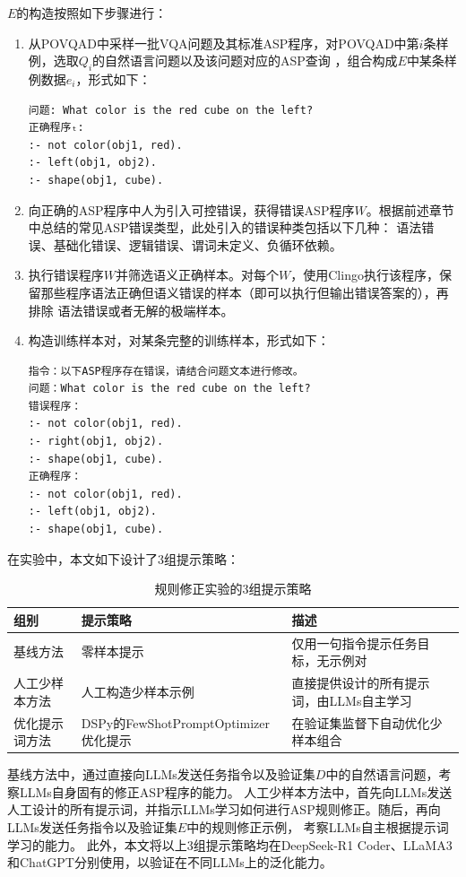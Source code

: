 $E$的构造按照如下步骤进行：
\begin{enumerate}[nosep]
\item 从POVQAD中采样一批VQA问题及其标准ASP程序，对POVQAD中第$i$条样例，选取$Q_i$的自然语言问题以及该问题对应的ASP查询
，组合构成$E$中某条样例数据$e_i$，形式如下：
\begin{lstlisting}
问题: What color is the red cube on the left?
正确程序ₜ:
:- not color(obj1, red).
:- left(obj1, obj2).
:- shape(obj1, cube).
\end{lstlisting}
\item 向正确的ASP程序中人为引入可控错误，获得错误ASP程序$W$。根据前述章节中总结的常见ASP错误类型，此处引入的错误种类包括以下几种：
语法错误、基础化错误、逻辑错误、谓词未定义、负循环依赖。
\item 执行错误程序$W$并筛选语义正确样本。对每个$W$，使用Clingo执行该程序，保留那些程序语法正确但语义错误的样本（即可以执行但输出错误答案的），再排除
语法错误或者无解的极端样本。
\item 构造训练样本对，对某条完整的训练样本，形式如下：
\begin{lstlisting}
指令：以下ASP程序存在错误，请结合问题文本进行修改。
问题：What color is the red cube on the left?
错误程序：
:- not color(obj1, red).
:- right(obj1, obj2). 
:- shape(obj1, cube).
正确程序：
:- not color(obj1, red).
:- left(obj1, obj2).
:- shape(obj1, cube).
\end{lstlisting}
\end{enumerate}

在实验中，本文如下设计了3组提示策略：
\begin{table}[H]
\centering
\caption{规则修正实验的3组提示策略}
\begin{tabular}{|l|p{5.5cm}|p{5.5cm}|}
\hline
\textbf{组别} & \textbf{提示策略} & \textbf{描述} \\
\hline
基线方法 & 零样本提示 & 仅用一句指令提示任务目标，无示例对 \\
\hline
人工少样本方法 & 人工构造少样本示例 & 直接提供设计的所有提示词，由LLMs自主学习 \\
\hline
优化提示词方法 & DSPy的FewShotPromptOptimizer优化提示 & 在验证集监督下自动优化少样本组合 \\
\hline
\end{tabular}
\end{table}
基线方法中，通过直接向LLMs发送任务指令以及验证集$D$中的自然语言问题，考察LLMs自身固有的修正ASP程序的能力。
人工少样本方法中，首先向LLMs发送人工设计的所有提示词，并指示LLMs学习如何进行ASP规则修正。随后，再向LLMs发送任务指令以及验证集$E$中的规则修正示例，
考察LLMs自主根据提示词学习的能力。
此外，本文将以上3组提示策略均在DeepSeek-R1 Coder、LLaMA3和ChatGPT分别使用，以验证在不同LLMs上的泛化能力。

